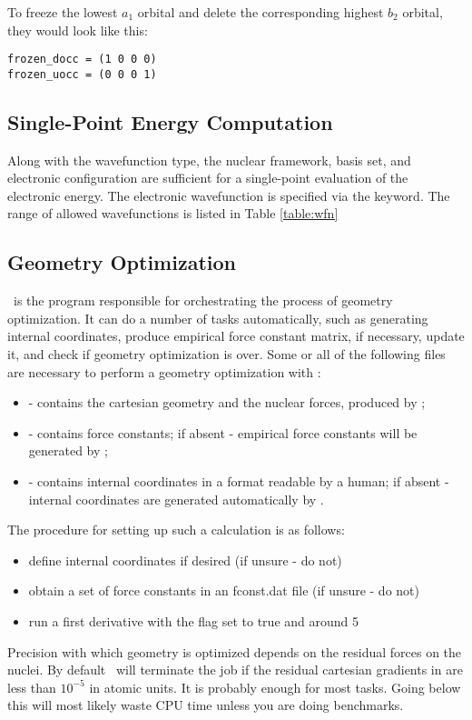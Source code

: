 To freeze the lowest $a_1$ orbital and delete the corresponding
highest $b_2$ orbital, they would look like this: 
\begin{verbatim}
frozen_docc = (1 0 0 0)
frozen_uocc = (0 0 0 1)
\end{verbatim}

\subsection{Single-Point Energy Computation}
Along with the wavefunction type, the nuclear framework, basis set,
and electronic configuration are sufficient
for a single-point evaluation of the electronic energy.
The electronic wavefunction is specified via the  keyword.
The range of allowed wavefunctions is listed in Table \ref{table:wfn}

\subsection{Geometry Optimization}
\PSIoptking\ is the program responsible for orchestrating the
process of geometry optimization. It can do a number of tasks
automatically, such as generating internal coordinates, produce
empirical force constant matrix, if necessary, update it, and
check if geometry optimization is over. Some or all of the following
files are necessary to perform a geometry optimization with \PSIoptking:
\begin{itemize} 
\item {} - contains the cartesian geometry and the nuclear forces, produced by \PSIcderiv ;
\item \fconstdat - contains force constants; if absent - empirical force constants will
be generated by \PSIoptking ;
\item \intcodat - contains internal coordinates in a format readable by a human;
if absent - internal coordinates are generated automatically by \PSIoptking .
\end{itemize}

The procedure for setting up such a calculation is as follows: 
\begin{itemize}
\item define internal coordinates if desired (if unsure - do not)
\item obtain a set of force constants in an fconst.dat file (if unsure - do not) 
\item run a first derivative with the  flag set to true and  around 5
\end{itemize}
Precision with which geometry is optimized depends on the residual
forces on the nuclei. By default \PSIoptking\ will terminate the job
if the residual cartesian gradients in  are less than
$10^{-5}$ in atomic units. It is probably enough for most
tasks. Going below this will most likely waste CPU
time unless you are doing benchmarks.


